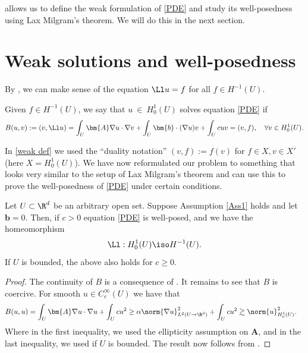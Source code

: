 \documentclass[
    a4paper,
    DIV=14,
    abstract=true,
    numbers=noenddot
]{scrartcl}
\begin{document}
 allows us to define the weak formulation of \eqref{PDE} and study its well-posedness using Lax Milgram's theorem. We will do this in the next section.
\section{Weak solutions and well-posedness}
By , we can make sense of the equation $\Ll u =f$ for all $f \in H^{-1}(U)$.
\begin{definition}
    Given $f \in H^{-1}(U)$, we say that $u~\in~H_0^1(U)$ solves equation \eqref{PDE} if
    \begin{align}\label{weak def}
        B(u,v):= (v, \Ll u)=\int_{U}\bm{A} \nabla u \cdot \nabla v + \int_{U} \bm{b} \cdot ( \nabla u) v + \int_{U} cuv= (v,f), \quad \forall v \in H_0^1(U).
    \end{align}
\end{definition}
In \eqref{weak def} we used the ``duality notation'' $(v,f):= f(v)$ for $f \in X, v \in X'$ (here $X= H_0^1(U)$). We have now reformulated our problem to something that looks very similar to the setup of Lax Milgram's theorem and can use this to prove the well-posedness of \eqref{PDE} under certain conditions.
\begin{theorem}\label{well-posed 1}
    Let $U \subset \R^d$ be an arbitrary open set. Suppose Assumption \ref{Ass1} holds and let $\bm{b}=0$. Then, if $c >0$  equation \eqref{PDE} is well-posed, and we have the homeomorphism
    \begin{align*}
        \Ll : H_0^1(U) \iso H^{-1}(U).
    \end{align*}
    If $U$ is bounded, the above also holds for $c\geq 0$.
\end{theorem}
\begin{proof}
    The continuity of $B$ is a consequence of . It remains to see that $B$ is coercive. For smooth $u \in C_c^\infty(U)$ we have that
    \begin{align}\label{b=0}
        B(u,u) & = \int_{U}\bm{A} \nabla u \cdot \nabla u + \int_{U} cu^2 \geq \alpha \norm{\nabla u}^2_{L^2(U \to \R^d)} + \int_{U}c u^2 \gtrsim \norm{u}^2_{H^1_0(U)}.
    \end{align}
    Where in the first inequality, we used the ellipticity assumption on $\bm{A}$, and in the last inequality, we used  if $U$ is bounded. The result now follows from .
\end{proof}
\end{document}
